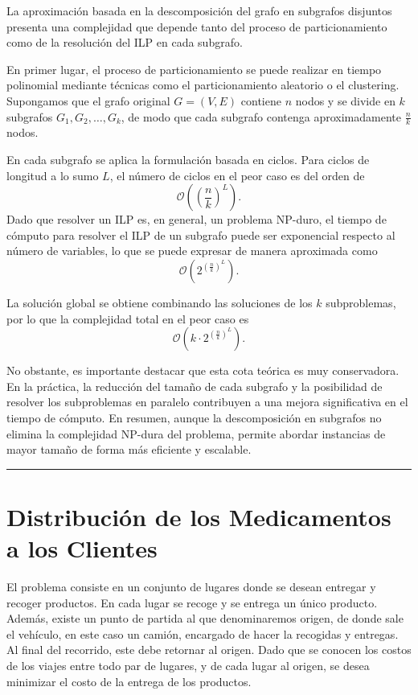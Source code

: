 \documentclass[twocolumn, fontsize=10pt]{article}
\begin{document}
La aproximación basada en la descomposición del grafo en subgrafos disjuntos presenta una complejidad que depende tanto del proceso de particionamiento como de la resolución del ILP en cada subgrafo.

En primer lugar, el proceso de particionamiento se puede realizar en tiempo polinomial mediante técnicas como el particionamiento aleatorio o el clustering. Supongamos que el grafo original \( G = (V,E) \) contiene \( n \) nodos y se divide en \( k \) subgrafos \( G_1, G_2, \dots, G_k \), de modo que cada subgrafo contenga aproximadamente \( \frac{n}{k} \) nodos.

En cada subgrafo se aplica la formulación basada en ciclos. Para ciclos de longitud a lo sumo \( L \), el número de ciclos en el peor caso es del orden de
\[
\mathcal{O}\left(\left(\frac{n}{k}\right)^L\right).
\]
Dado que resolver un ILP es, en general, un problema NP-duro, el tiempo de cómputo para resolver el ILP de un subgrafo puede ser exponencial respecto al número de variables, lo que se puede expresar de manera aproximada como
\[
\mathcal{O}\left(2^{\left(\frac{n}{k}\right)^L}\right).
\]

La solución global se obtiene combinando las soluciones de los \( k \) subproblemas, por lo que la complejidad total en el peor caso es
\[
\mathcal{O}\left(k \cdot 2^{\left(\frac{n}{k}\right)^L}\right).
\]

No obstante, es importante destacar que esta cota teórica es muy conservadora. En la práctica, la reducción del tamaño de cada subgrafo y la posibilidad de resolver los subproblemas en paralelo contribuyen a una mejora significativa en el tiempo de cómputo. En resumen, aunque la descomposición en subgrafos no elimina la complejidad NP-dura del problema, permite abordar instancias de mayor tamaño de forma más eficiente y escalable.


\rule{\linewidth}{0.5pt}

\section{Distribución de los Medicamentos a los Clientes}
El problema consiste en un conjunto de lugares donde se desean entregar y recoger productos. En cada lugar se recoge y se entrega un único producto. Además, existe un punto de partida al que denominaremos origen, de donde sale el vehículo, en este caso un camión, encargado de hacer la recogidas y entregas. Al final del recorrido, este debe retornar al origen.  Dado que se conocen los costos de los viajes entre todo par de lugares, y de cada lugar al origen, se desea minimizar el costo de la entrega de los productos.
\end{document}
